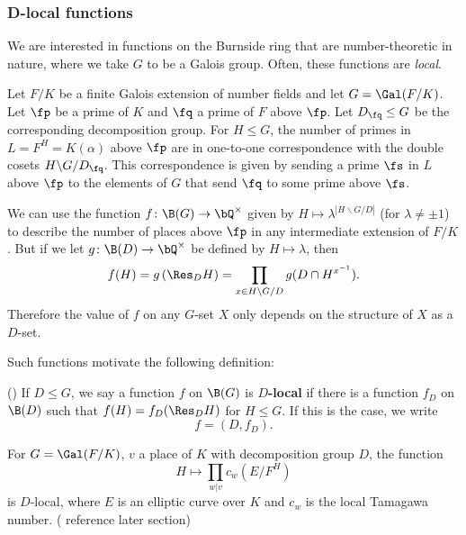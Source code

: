 \subsubsection{D-local functions}\label{D-loc}

We are interested in functions on the Burnside ring that are number-theoretic in nature, where we take $G$ to be a Galois group. Often, these functions are \textit{local}. 

\begin{example}
Let $F / K$ be a finite Galois extension of number fields and let $G = \Gal(F / K)$. Let $\fp$ be a prime of $K$ and $\fq$ a prime of $F$ above $\fp$. Let $D_{\fq} \leq G$ be the corresponding decomposition group. For $H \leq G$, the number of primes in $L = F^{H} = K(\alpha)$ above $\fp$ are in one-to-one correspondence with the double cosets $H \backslash G / D_{\fq}$. This correspondence is given by sending a prime $\fs$ in $L$ above $\fp$ to the elements of $G$ that send $\fq$ to some prime above $\fs$.

We can use the function $f \colon \B(G) \to \bQ^{\times}$ given by $H \mapsto  \lambda^{| H \backslash G / D|}$ (for $\lambda \not= \pm 1$) to describe the number of places above $\fp$ in any intermediate extension of $F / K$. But if we let $g \colon \B(D) \to \bQ^{\times}$ be defined by $H \mapsto \lambda$, then 
        \[ f(H) = g\left(\Res_D H\right) = \prod_{x \in H \backslash G / D} g(D \cap H^{x^{-1}}) .\]
Therefore the value of $f$ on any $G$-set $X$ only depends on the structure of $X$ as a $D$-set.
\end{example}

Such functions motivate the following definition:

\begin{defn}(\cite[Definition 2.33]{reg-const})\label{D-loc-fn}
    If $D \leq G$, we say a function $f$ on $\B(G)$ is \textbf{$D$-local} if there is a function $f_D$ on $\B(D)$ such that $f(H) = f_D(\Res_D H)$ for $H \leq G$.
    If this is the case, we write
    \[ f = (D, f_D). \]
\end{defn}

\begin{example}\label{tama-ex}
    For $G = \Gal(F / K)$, $v$ a place of $K$ with decomposition group $D$, the function
    \[ H \mapsto \prod_{w | v} c_w(E / F^{H}) \]
    is $D$-local, where $E$ is an elliptic curve over $K$ and $c_w$ is the local Tamagawa number. ({\color{red} reference later section})
\end{example}

